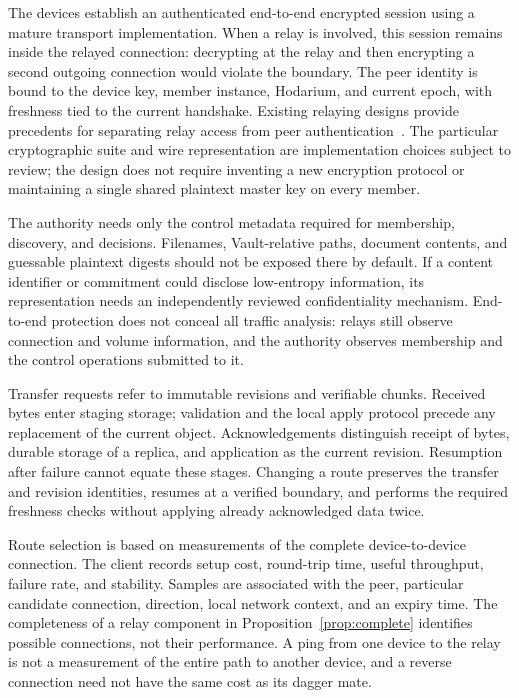 \documentclass[11pt,a4paper]{article}
\theoremstyle{definition}
\theoremstyle{plain}
\begin{document}
The devices establish an authenticated end-to-end encrypted session
using a mature transport implementation. When a relay is involved,
this session remains inside the relayed connection: decrypting at the
relay and then encrypting a second outgoing connection would violate
the boundary. The peer identity is bound to the device key, member
instance, Hodarium, and current epoch, with freshness tied to the
current handshake. Existing relaying designs provide precedents for
separating relay access from peer authentication~\cite{relay}. The
particular cryptographic suite and wire representation are implementation
choices subject to review; the design does not require inventing a
new encryption protocol or maintaining a single shared plaintext
master key on every member.

The authority needs only the control metadata required for membership,
discovery, and decisions. Filenames, Vault-relative paths, document
contents, and guessable plaintext digests should not be exposed there
by default. If a content identifier or commitment could disclose
low-entropy information, its representation needs an independently
reviewed confidentiality mechanism. End-to-end protection does not
conceal all traffic analysis: relays still observe connection and
volume information, and the authority observes membership and the
control operations submitted to it.

Transfer requests refer to immutable revisions and verifiable chunks.
Received bytes enter staging storage; validation and the local apply
protocol precede any replacement of the current object. Acknowledgements
distinguish receipt of bytes, durable storage of a replica, and
application as the current revision. Resumption after failure cannot
equate these stages. Changing a route preserves the transfer and revision
identities, resumes at a verified boundary, and performs the required
freshness checks without applying already acknowledged data twice.

Route selection is based on measurements of the complete device-to-device
connection. The client records setup cost, round-trip time, useful
throughput, failure rate, and stability. Samples are associated with
the peer, particular candidate connection, direction, local network
context, and an expiry time. The completeness of a relay component in
Proposition~\ref{prop:complete} identifies possible connections, not
their performance. A ping from one device to the relay is not a
measurement of the entire path to another device, and a reverse
connection need not have the same cost as its dagger mate.
\end{document}
